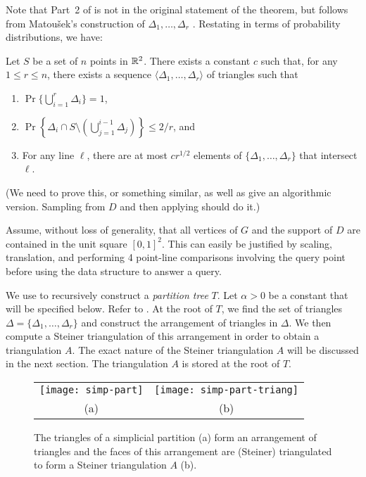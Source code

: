\documentclass{patmorin}
\begin{document}
Note that Part~2 of  is not in the original
statement of the theorem, but follows from Matou\v{s}ek's construction
of $\Delta_1,\ldots,\Delta_r$ \cite{m91}.
Restating  in terms of probability distributions,
we have:

\begin{thm}
Let $S$ be a set of $n$ points in $\mathbb{R}^2$. There exists a constant
$c$ such that, for any $1\le r \le n$, there exists a sequence
$\langle \Delta_1,\ldots,\Delta_r\rangle$ of triangles such that
  \begin{enumerate}
    \item $\Pr\{\bigcup_{i=1}^r \Delta_i\} = 1$,
  
    \item $\Pr\left\{\Delta_i \cap S\setminus
    \left(\bigcup_{j=1}^{i-1}\Delta_j\right)\right\} \le 2/r$, and
  
    \item For any line $\ell$, there are at most $cr^{1/2}$ elements of
    $\{\Delta_1,\ldots,\Delta_r\}$ that intersect $\ell$.
  \end{enumerate}
\end{thm}

(We need to prove this, or something similar, as well as give an
algorithmic version.  Sampling from $D$ and then applying
 should do it.)

Assume, without loss of generality, that all vertices of $G$ and the support
of $D$ are contained in the unit square $[0,1]^2$.  This can easily be
justified by scaling, translation, and performing 4 point-line comparisons
involving the query point before using the data structure to answer a query.

We use  to recursively construct a \emph{partition
tree} $T$.  Let $\alpha > 0$ be a constant that will be specified
below.  Refer to . At the root of $T$, we find the
set of triangles $\Delta=\{\Delta_1,\ldots,\Delta_r\}$ and construct
the arrangement of triangles in $\Delta$.  We then compute a Steiner
triangulation of this arrangement in order to obtain a triangulation
$A$. The exact nature of the Steiner triangulation $A$ will be discussed
in the next section.  The triangulation $A$ is stored at the root of
$T$.

\begin{figure}
  \begin{center}
    \begin{tabular}{cc}
      \texttt{[image: simp-part]} & \texttt{[image: simp-part-triang]} \\
      (a) & (b)
    \end{tabular}
  \end{center}
  \caption{The triangles of a simplicial partition (a) form an arrangement of
    triangles and the faces of this arrangement are (Steiner) triangulated
    to form a Steiner triangulation $A$ (b).}
\end{figure}
\end{document}
